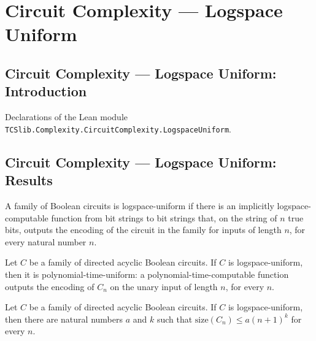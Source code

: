 \section{Circuit Complexity --- Logspace Uniform}
\subsection*{Circuit Complexity --- Logspace Uniform: Introduction}

Declarations of the Lean module \texttt{TCSlib.Complexity.CircuitComplexity.LogspaceUniform}.

\subsection*{Circuit Complexity --- Logspace Uniform: Results}

\begin{definition}
\label{BoolCircuit.DAGCircuitFamily.IsLogspaceUniform}
\leanok
{}
A family of Boolean circuits is logspace-uniform if there is an implicitly
logspace-computable function from bit strings to bit strings that, on the string of $n$
true bits, outputs the encoding of the circuit in the family for inputs of length $n$,
for every natural number $n$.
\end{definition}

\begin{theorem}
\label{BoolCircuit.DAGCircuitFamily.IsLogspaceUniform.isPUniform}
\leanok
{}
Let $C$ be a family of directed acyclic Boolean circuits. If $C$ is logspace-uniform,
then it is polynomial-time-uniform: a polynomial-time-computable function outputs the
encoding of $C_n$ on the unary input of length $n$, for every $n$.
\end{theorem}

\begin{theorem}
\label{BoolCircuit.DAGCircuitFamily.IsLogspaceUniform.isPolySize}
\leanok
{}
Let $C$ be a family of directed acyclic Boolean circuits. If $C$ is logspace-uniform,
then there are natural numbers $a$ and $k$ such that $\mathrm{size}(C_n)\leq a(n+1)^k$
for every $n$.
\end{theorem}

